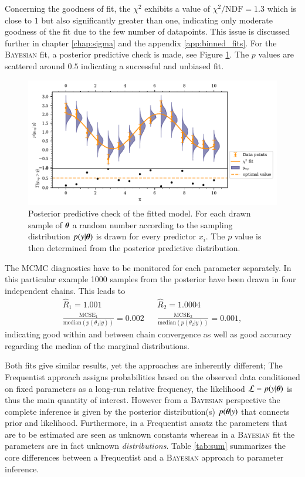 Concerning the goodness of fit, the $\chi^2$ exhibits a value of $\chi^2/\text{NDF}=1.3$ which is close to $1$ but also significantly greater than one, indicating only moderate goodness of the fit due to the few number of datapoints. This issue is discussed further in chapter \ref{chap:sigma} and the appendix \ref{app:binned_fits}. For the \textsc{Bayesian} fit, a posterior predictive check is made, see Figure \ref{fig:ppc}. The $p$ values are scattered around $0.5$ indicating a successful and unbiased fit.
\begin{figure}[htbp]
	\centering
	\includegraphics[width=\linewidth]{../bayes/noisy_model/ppd_2_params.pdf}
	\caption{Posterior predictive check of the fitted model. For each drawn sample of $\boldsymbol{\theta}$ a random number according to the sampling distribution $p(y|\boldsymbol{\theta})$ is drawn for every predictor $x_i$. The $p$ value is then determined from the posterior predictive distribution.}
	\label{fig:ppc}
\end{figure}
The MCMC diagnostics have to be monitored for each parameter separately. In this particular example 1000 samples from the posterior have been drawn in four independent chains. This leads to
\begin{align}
	\widehat{R}_1 = 1.001 && \widehat{R}_2 = 1.0004\\
	\frac{\text{MCSE}_1}{\text{median}(p(\theta_1|y))}=0.002 &&\frac{\text{MCSE}_2}{\text{median}(p(\theta_2|y))}=0.001,
\end{align}
indicating good within and between chain convergence as well as good accuracy regarding the median of the marginal distributions.

Both fits give similar results, yet the approaches are inherently different; The Frequentist approach assigns probabilities based on the observed data conditioned on fixed parameters as a long-run relative frequency, the likelihood $\mathcal{L}=p(y|\boldsymbol{\theta})$ is thus the main quantity of interest. However from a \textsc{Bayesian} perspective the complete inference is given by the posterior distribution(s) $p(\boldsymbol{\theta}|y)$ that connects prior and likelihood. Furthermore, in a Frequentist ansatz the parameters that are to be estimated are seen as unknown constants whereas in a \textsc{Bayesian} fit the parameters are in fact unknown \emph{distributions}. Table \ref{tab:sum} summarizes the core differences between a Frequentist and a \textsc{Bayesian} approach to parameter inference. \cite{bayes1}

